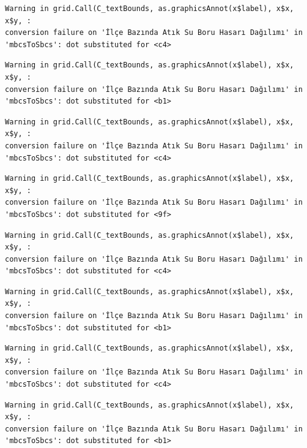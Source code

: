 \documentclass[
  11pt,
  a4paper,
  DIV=11,
  numbers=noendperiod]{scrartcl}
\begin{document}
\begin{verbatim}
Warning in grid.Call(C_textBounds, as.graphicsAnnot(x$label), x$x, x$y, :
conversion failure on 'İlçe Bazında Atık Su Boru Hasarı Dağılımı' in
'mbcsToSbcs': dot substituted for <c4>
\end{verbatim}

\begin{verbatim}
Warning in grid.Call(C_textBounds, as.graphicsAnnot(x$label), x$x, x$y, :
conversion failure on 'İlçe Bazında Atık Su Boru Hasarı Dağılımı' in
'mbcsToSbcs': dot substituted for <b1>
\end{verbatim}

\begin{verbatim}
Warning in grid.Call(C_textBounds, as.graphicsAnnot(x$label), x$x, x$y, :
conversion failure on 'İlçe Bazında Atık Su Boru Hasarı Dağılımı' in
'mbcsToSbcs': dot substituted for <c4>
\end{verbatim}

\begin{verbatim}
Warning in grid.Call(C_textBounds, as.graphicsAnnot(x$label), x$x, x$y, :
conversion failure on 'İlçe Bazında Atık Su Boru Hasarı Dağılımı' in
'mbcsToSbcs': dot substituted for <9f>
\end{verbatim}

\begin{verbatim}
Warning in grid.Call(C_textBounds, as.graphicsAnnot(x$label), x$x, x$y, :
conversion failure on 'İlçe Bazında Atık Su Boru Hasarı Dağılımı' in
'mbcsToSbcs': dot substituted for <c4>
\end{verbatim}

\begin{verbatim}
Warning in grid.Call(C_textBounds, as.graphicsAnnot(x$label), x$x, x$y, :
conversion failure on 'İlçe Bazında Atık Su Boru Hasarı Dağılımı' in
'mbcsToSbcs': dot substituted for <b1>
\end{verbatim}

\begin{verbatim}
Warning in grid.Call(C_textBounds, as.graphicsAnnot(x$label), x$x, x$y, :
conversion failure on 'İlçe Bazında Atık Su Boru Hasarı Dağılımı' in
'mbcsToSbcs': dot substituted for <c4>
\end{verbatim}

\begin{verbatim}
Warning in grid.Call(C_textBounds, as.graphicsAnnot(x$label), x$x, x$y, :
conversion failure on 'İlçe Bazında Atık Su Boru Hasarı Dağılımı' in
'mbcsToSbcs': dot substituted for <b1>
\end{verbatim}
\end{document}
